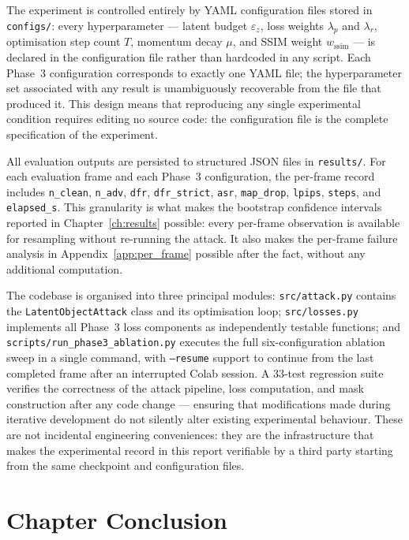 \documentclass[12pt,a4paper]{report}
\begin{document}
The experiment is controlled entirely by YAML configuration
files stored in \texttt{configs/}: every hyperparameter ---
latent budget $\varepsilon_z$, loss weights $\lambda_p$ and
$\lambda_r$, optimisation step count $T$, momentum decay $\mu$,
and SSIM weight $w_{\text{ssim}}$ --- is declared in the
configuration file rather than hardcoded in any script. Each
Phase~3 configuration corresponds to exactly one YAML file; the
hyperparameter set associated with any result is unambiguously
recoverable from the file that produced it. This design means
that reproducing any single experimental condition requires
editing no source code: the configuration file is the complete
specification of the experiment.

All evaluation outputs are persisted to structured JSON files
in \texttt{results/}. For each evaluation frame and each
Phase~3 configuration, the per-frame record includes
\texttt{n\_clean}, \texttt{n\_adv}, \texttt{dfr},
\texttt{dfr\_strict}, \texttt{asr}, \texttt{map\_drop},
\texttt{lpips}, \texttt{steps}, and \texttt{elapsed\_s}.
This granularity is what makes the bootstrap confidence
intervals reported in Chapter~\ref{ch:results} possible:
every per-frame observation is available for resampling
without re-running the attack. It also makes the per-frame
failure analysis in Appendix~\ref{app:per_frame} possible
after the fact, without any additional computation.

The codebase is organised into three principal modules:
\texttt{src/attack.py} contains the \texttt{LatentObjectAttack}
class and its optimisation loop; \texttt{src/losses.py}
implements all Phase~3 loss components as independently
testable functions; and \texttt{scripts/run\_phase3\_ablation.py}
executes the full six-configuration ablation sweep in a single
command, with \texttt{--resume} support to continue from the
last completed frame after an interrupted Colab session.
A 33-test regression suite verifies the correctness of the
attack pipeline, loss computation, and mask construction after
any code change --- ensuring that modifications made during
iterative development do not silently alter existing
experimental behaviour. These are not incidental engineering
conveniences: they are the infrastructure that makes the
experimental record in this report verifiable by a third party
starting from the same checkpoint and configuration files.

\section*{Chapter Conclusion}
\label{sec:ch1_conclusion}
\end{document}
